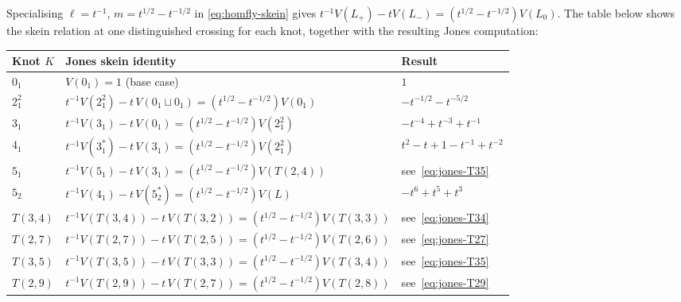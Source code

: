 \begin{remark}
\label{rem:jones-skein-per-knot}
Specialising $\ell = t^{-1}$, $m = t^{1/2}-t^{-1/2}$ in
\eqref{eq:homfly-skein} gives
$t^{-1}V(L_+) - tV(L_-) = (t^{1/2}-t^{-1/2})V(L_0)$.
The table below shows the skein relation at one distinguished crossing
for each knot, together with the resulting Jones computation:

\medskip
{\renewcommand{\arraystretch}{1.4}
\noindent\begin{tabular}{lll}
\hline
\textbf{Knot $K$} & \textbf{Jones skein identity} & \textbf{Result} \\
\hline
$0_1$
  & $V(0_1) = 1$ (base case)
  & $1$ \\[2pt]
$2^2_1$
  & $t^{-1}V(2^2_1) - t\,V(0_1\sqcup 0_1) = (t^{1/2}-t^{-1/2})V(0_1)$
  & $-t^{-1/2}-t^{-5/2}$ \\[2pt]
$3_1$
  & $t^{-1}V(3_1) - t\,V(0_1) = (t^{1/2}-t^{-1/2})V(2^2_1)$
  & $-t^{-4}+t^{-3}+t^{-1}$ \\[2pt]
$4_1$
  & $t^{-1}V(3_1^*) - t\,V(3_1) = (t^{1/2}-t^{-1/2})V(2^2_1)$
  & $t^2-t+1-t^{-1}+t^{-2}$ \\[2pt]
$5_1$
  & $t^{-1}V(5_1)-t\,V(3_1)=(t^{1/2}-t^{-1/2})V(T(2,4))$
  & see~\eqref{eq:jones-T35} \\[2pt]
$5_2$
  & $t^{-1}V(4_1)-t\,V(5_2^*)=(t^{1/2}-t^{-1/2})V(L)$
  & $-t^6+t^5+t^3$ \\[2pt]
$T(3,4)$
  & $t^{-1}V(T(3,4))-t\,V(T(3,2))=(t^{1/2}-t^{-1/2})V(T(3,3))$
  & see~\eqref{eq:jones-T34} \\[2pt]
$T(2,7)$
  & $t^{-1}V(T(2,7))-t\,V(T(2,5))=(t^{1/2}-t^{-1/2})V(T(2,6))$
  & see~\eqref{eq:jones-T27} \\[2pt]
$T(3,5)$
  & $t^{-1}V(T(3,5))-t\,V(T(3,3))=(t^{1/2}-t^{-1/2})V(T(3,4))$
  & see~\eqref{eq:jones-T35} \\[2pt]
$T(2,9)$
  & $t^{-1}V(T(2,9))-t\,V(T(2,7))=(t^{1/2}-t^{-1/2})V(T(2,8))$
  & see~\eqref{eq:jones-T29} \\[2pt]
\hline
\end{tabular}}
\end{remark}

